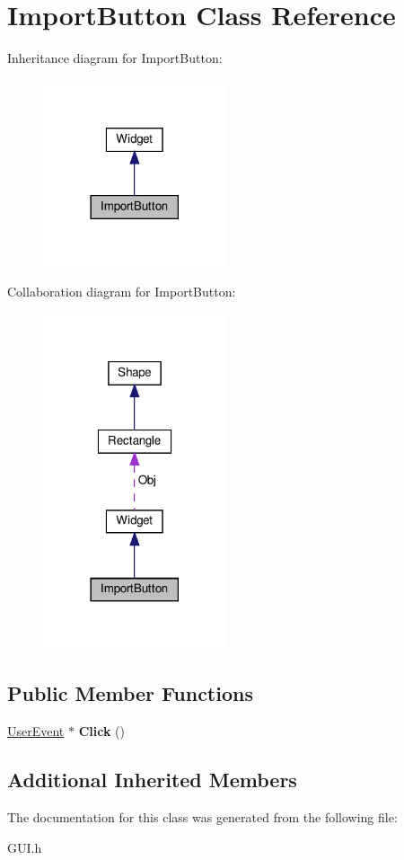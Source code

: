 \hypertarget{classImportButton}{}\section{Import\+Button Class Reference}
\label{classImportButton}


Inheritance diagram for Import\+Button\+:\nopagebreak
\begin{figure}[H]
\begin{center}
\leavevmode
\includegraphics[width=153pt]{classImportButton__inherit__graph}
\end{center}
\end{figure}


Collaboration diagram for Import\+Button\+:\nopagebreak
\begin{figure}[H]
\begin{center}
\leavevmode
\includegraphics[width=153pt]{classImportButton__coll__graph}
\end{center}
\end{figure}
\subsection*{Public Member Functions}
\begin{DoxyCompactItemize}
\item 
\mbox{\label{classImportButton_a2db0b7e9a7fdfc15607f12408f7bb2b4}} 
\hyperlink{classUserEvent}{User\+Event} $\ast$ {\bfseries Click} ()
\end{DoxyCompactItemize}
\subsection*{Additional Inherited Members}


The documentation for this class was generated from the following file\+:\begin{DoxyCompactItemize}
\item 
G\+U\+I.\+h\end{DoxyCompactItemize}
